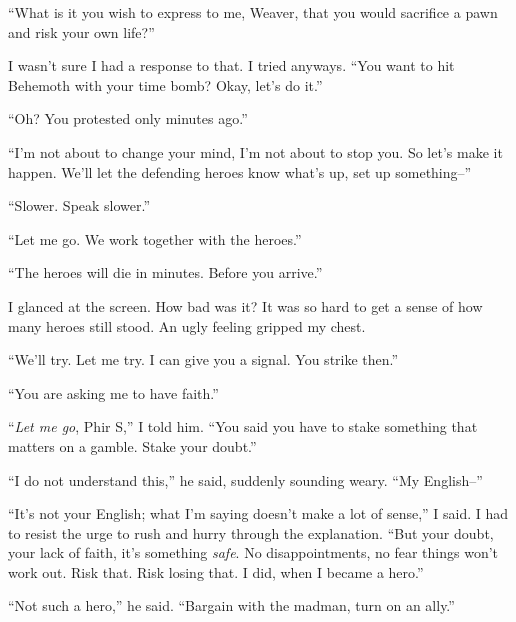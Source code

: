 ``What is it you wish to express to me, Weaver, that you would sacrifice a pawn and risk your own life?''



I wasn't sure I had a response to that.  I tried anyways.  ``You want to hit Behemoth with your time bomb?  Okay, let's do it.''



``Oh?  You protested only minutes ago.''



``I'm not about to change your mind, I'm not about to stop you.  So let's make it happen.  We'll let the defending heroes know what's up, set up something--''



``Slower.  Speak slower.''



``Let me go.  We work together with the heroes.''



``The heroes will die in minutes.  Before you arrive.''



I glanced at the screen.  How bad was it?  It was so hard to get a sense of how many heroes still stood.  An ugly feeling gripped my chest.



``We'll try.  Let me try.  I can give you a signal.  You strike then.''



``You are asking me to have faith.''



``\emph{Let me go}, Phir S,'' I told him.  ``You said you have to stake something that matters on a gamble.  Stake your doubt.''



``I do not understand this,'' he said, suddenly sounding weary.  ``My English--''



``It's not your English; what I'm saying doesn't make a lot of sense,'' I said.  I had to resist the urge to rush and hurry through the explanation.  ``But your doubt, your lack of faith, it's something \emph{safe}.  No disappointments, no fear things won't work out.    Risk that.  Risk losing that.  I did, when I became a hero.''



``Not such a hero,'' he said.  ``Bargain with the madman, turn on an ally.''



